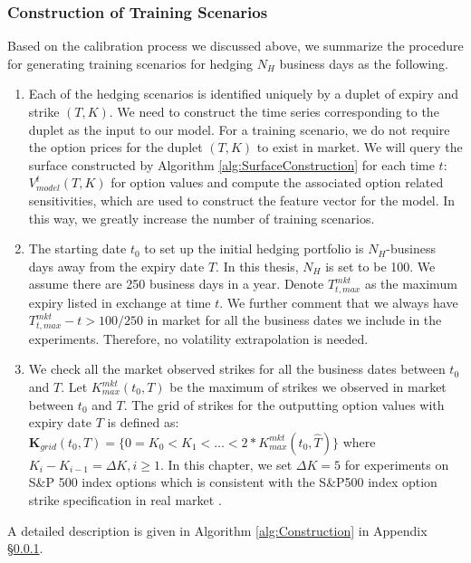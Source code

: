 \subsubsection{Construction of Training Scenarios}
Based on the calibration process we discussed above, we summarize the procedure for generating training scenarios for hedging $N_H$ business days as the following. \begin{enumerate}
	\item Each of the hedging scenarios is identified uniquely by a duplet of expiry and strike  $(T,K)$. We need to construct the time series corresponding to the duplet as the input to our model. For a training scenario, we do not require the option prices for the  duplet $(T,K)$ to exist in market. We will query the surface constructed by Algorithm \ref{alg:SurfaceConstruction} for each time $t$: $V_{model}^t(T,K)$ for option values and compute the associated option related sensitivities, which are used to construct the feature vector for the model. In this way, we greatly increase the number of training scenarios.  
	\item The starting date $t_0$ to set up the initial hedging portfolio is  $N_H$-business days away from the expiry date $T$. In this thesis,  $N_H$ is set to be 100.  We assume there are 250 business days in a year. Denote $T_{t,max}^{mkt}$ as the maximum expiry listed in exchange at time $t$. We further comment that we always have $T_{t,max}^{mkt}-t>100/250$ in market for all the business dates we include in the experiments.  Therefore, no volatility extrapolation is needed.
	\item We check all the market observed strikes for all the business dates between $t_0$ and  $T$. Let $K^{mkt}_{max}(t_0,T)$ be the maximum of  strikes we observed in market  between $t_0$ and  $T$. The grid of strikes for the outputting option values with expiry date $T$ is defined as: $\mathbf{K}_{grid}(t_0,{T})=\{0=K_0<K_1<\dots<2*K^{mkt}_{max}(t_0,\widehat{T})\}$ where $K_i-K_{i-1}=\Delta K, i \geq 1$. In this chapter, we set $\Delta K=5$ for experiments on S\&P 500 index options which is consistent with the S\&P500 index option strike specification in real market \cite{hull2006options}.
\end{enumerate}
A detailed description is given in Algorithm \ref{alg:Construction} in Appendix \S \ref{}.

